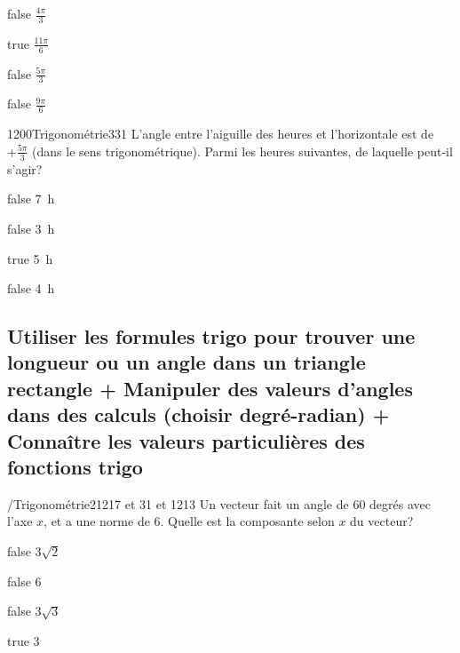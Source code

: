 \documentclass[11pt]{article}
\begin{document}
            \begin{reponses}
                \item[false] $\frac{4\pi}{3}$
                \item[true] $\frac{11\pi}{6}$
                \item[false] $\frac{5\pi}{3}$
                \item[false] $\frac{9\pi}{6}$
            \end{reponses}

            \begin{question}{1200}{Trigonométrie}{3}{31}
                L'angle entre l'aiguille des heures et l'horizontale est de $+\frac{5\pi}{3}$ (dans le sens trigonométrique). Parmi les heures suivantes, de laquelle peut-il s'agir?
            \end{question}

            \begin{reponses}
                \item[false] \SI{7}{\hour}
                \item[false] \SI{3}{\hour}
                \item[true] \SI{5}{\hour} 
                \item[false] \SI{4}{\hour}
            \end{reponses}
	
		\subsection{Utiliser les formules trigo pour trouver une longueur ou un angle dans un triangle rectangle + Manipuler des valeurs d'angles dans des calculs (choisir degré-radian) + Connaître les valeurs particulières des fonctions trigo}

			\begin{question}{/}{Trigonométrie}{2}{1217 et 31 et 1213}
				Un vecteur fait un angle de 60 degrés avec l'axe $x$, et a une norme de 6. Quelle est la composante selon $x$ du vecteur?
            \end{question}

            \begin{reponses}
            	\item[false] $3\sqrt{2}$
            	\item[false] 6
                \item[false] $3\sqrt{3}$
                \item[true] 3
            \end{reponses}
\end{document}
